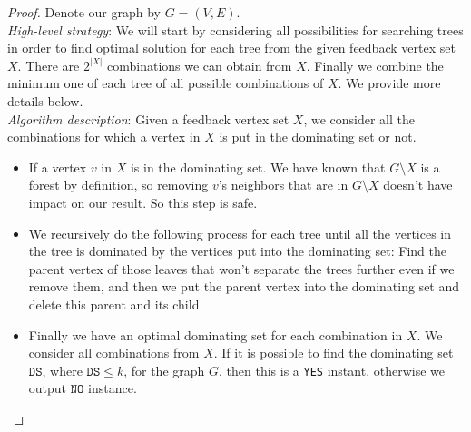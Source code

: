 \documentclass{article}
\begin{document}
\begin{proof} Denote our graph by $G=(V,E)$.\\

\noindent \emph{High-level strategy}: We will start by considering all possibilities for searching trees in order to find optimal solution for each tree from the given feedback vertex set \(X\). There are \(2^{|X|}\) combinations we can obtain from \(X\). Finally we combine the minimum one of each tree of all possible combinations of \(X\). We provide more details below. \\

\noindent \emph{Algorithm description}: Given a feedback vertex set \(X\), we consider all the combinations for which a vertex in \(X\) is put in the dominating set or not. 

\begin{itemize}
\item If a vertex \(v\) in \(X\) is in the dominating set. We have known that \(G \setminus X\) is a forest by definition, so removing \(v\)'s neighbors that are in \(G\setminus X\) doesn't have impact on our result. So this step is safe. 
\item We recursively do the following process for each tree until all the vertices in the tree is dominated by the vertices put into the dominating set: Find the parent vertex of those leaves that won't separate the trees further even if we remove them, and then we put the parent vertex into the dominating set and delete this parent and its child.
\item Finally we have an optimal dominating set for each combination in \(X\). We consider all combinations from \(X\). If it is possible to find the dominating set \(\texttt{DS}\), where \(\texttt{DS} \leq k\), for the graph \(G\), then this is a \texttt{YES} instant, otherwise we output \(\texttt{NO}\) instance. 
\end{itemize}




\end{proof}
\end{document}
